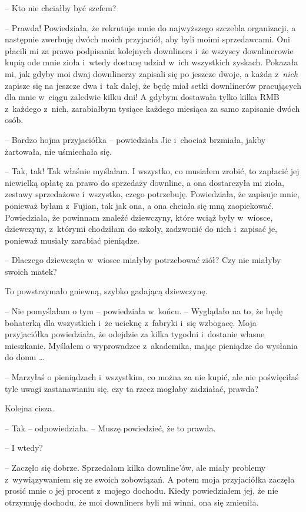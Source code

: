 \documentclass[oneside,polish,11pt,rmheadings]{mwbk}
\begin{document}
-- Kto nie chciałby być szefem?

-- Prawda! Powiedziała, że rekrutuje mnie do najwyższego szczebla organizacji, a następnie zwerbuję dwóch moich przyjaciół, aby byli moimi sprzedawcami. Oni płacili mi za prawo podpisania kolejnych downliners i~że wszyscy downlinerowie kupią ode mnie zioła i~wtedy dostanę udział w~ich wszystkich zyskach. Pokazała mi, jak gdyby moi dwaj downlinerzy zapisali się po jeszcze dwoje, a każda z~\textit{nich }zapisze się na jeszcze dwa i~tak dalej, że będę miał setki downlinerów pracujących dla mnie w~ciągu zaledwie kilku dni! A gdybym dostawała tylko kilka RMB z~każdego z~nich, zarabiałbym tysiące każdego miesiąca za samo zapisanie dwóch osób.

-- Bardzo hojna przyjaciółka -- powiedziała Jie i~chociaż brzmiała, jakby żartowała, nie uśmiechała się.

-- Tak, tak! Tak właśnie myślałam. I wszystko, co musiałem zrobić, to zapłacić jej niewielką opłatę za prawo do sprzedaży downline, a ona dostarczyła mi zioła, zestawy sprzedażowe i~wszystko, czego potrzebuję. Powiedziała, że zapisuje mnie, ponieważ byłam z~Fujian, tak jak ona, a ona chciała się mną zaopiekować. Powiedziała, że powinnam znaleźć dziewczyny, które wciąż były w~wiosce, dziewczyny, z~którymi chodziłam do szkoły, zadzwonić do nich i~zapisać je, ponieważ musiały zarabiać pieniądze.

-- Dlaczego dziewczęta w~wiosce miałyby potrzebować ziół? Czy nie miałyby swoich matek?

To powstrzymało gniewną, szybko gadającą dziewczynę. 

-- Nie pomyślałam o tym -- powiedziała w~końcu. -- Wyglądało na to, że będę bohaterką dla wszystkich i~że ucieknę z~fabryki i~się wzbogacę. Moja przyjaciółka powiedziała, że odejdzie za kilka tygodni i~dostanie własne mieszkanie. Myślałem o wyprowadzce z~akademika, mając pieniądze do wysłania do domu \ldots 

-- Marzyłaś o pieniądzach i~wszystkim, co można za nie kupić, ale nie poświęciłaś tyle uwagi zastanawianiu się, czy ta rzecz mogłaby zadziałać, prawda?

Kolejna cisza. 

-- Tak -- odpowiedziała. -- Muszę powiedzieć, że to prawda.

-- I wtedy? 

-- Zaczęło się dobrze. Sprzedałam kilka downline'ów, ale miały problemy z~wywiązywaniem się ze swoich zobowiązań. A potem moja przyjaciółka zaczęła prosić mnie o jej procent z~mojego dochodu. Kiedy powiedziałem jej, że nie otrzymuję dochodu, że moi downliners byli mi winni, ona się zmieniła.
\end{document}
